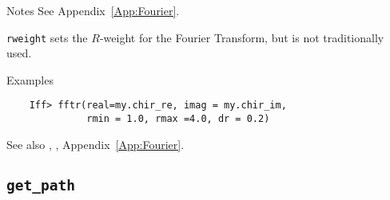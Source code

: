 \begin{IFFcom}
\item[Notes] See Appendix~{\ref{App:Fourier}}.

  {\texttt{rweight}} sets the $R$-weight for the Fourier Transform, but is
  not traditionally used.

\item[Examples] {\hspace{1.in} \vspace{-0.1truein} \relax }
\begin{verbatim} 
    Iff> fftr(real=my.chir_re, imag = my.chir_im, 
              rmin = 1.0, rmax =4.0, dr = 0.2)
\end{verbatim}
    \item[See also]  {}, {}, Appendix~{\ref{App:Fourier}}.
\end{IFFcom}


\relax\par\vfill
\subsection{\texttt{get\_path}}
    \label{Ch:Command:get-path}

